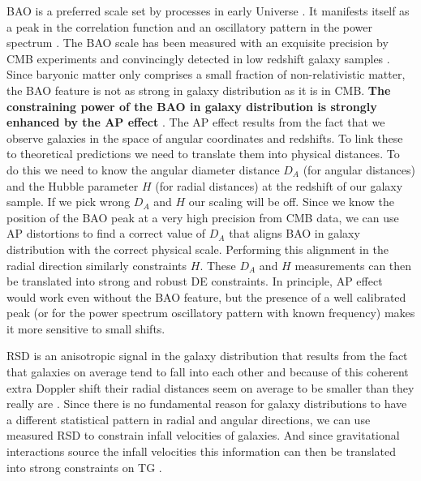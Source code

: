 BAO is a preferred scale set by processes in early Universe
\cite{1970ApJ...162..815P,1970Ap&SS...7....3S}. It manifests
itself as a peak in the correlation function and an oscillatory pattern in the
power spectrum \cite{1997Natur.386...37H,1998ApJ...496..605E}. The BAO scale has been measured with an exquisite precision by
CMB experiments and convincingly detected in low redshift galaxy samples
\cite{2005MNRAS.362..505C,2005ApJ...633..560E,2010MNRAS.401.2148P,2011MNRAS.416.3017B,2011MNRAS.418.1707B,2014JCAP...05..027F,2015A&A...574A..59D,2015MNRAS.449..835R}. Since
baryonic matter only comprises a small fraction of non-relativistic matter, the
BAO feature is not as strong in galaxy distribution as it is in CMB. \textbf{The
constraining power of the BAO in galaxy distribution is strongly enhanced by
the AP effect} \cite{1979Natur.281..358A}. The AP effect results from the fact that we observe galaxies in the space of
angular coordinates and redshifts. To link these  to theoretical  predictions
we need to translate them into physical distances. To do this we need to know
the angular diameter distance $D_A$ (for angular distances)  and the Hubble
parameter $H$ (for radial distances) at the redshift of our galaxy sample. If
we pick wrong $D_A$ and $H$ our scaling will be off. Since we know the
position of the BAO peak at a very high precision from CMB data, we can use AP
distortions to find a correct value of $D_A$ that aligns BAO in galaxy
distribution with the correct physical scale. Performing this alignment in the
radial direction similarly constraints $H$. These $D_A$ and $H$ measurements
can then be translated into strong and robust DE constraints. In principle, AP
effect would work even without the BAO feature, but the presence of a well
calibrated peak (or for the power spectrum oscillatory pattern with known
frequency) makes it more sensitive to small shifts.

RSD is an anisotropic signal in the galaxy distribution that results from the
fact that galaxies on average tend to fall into each other and because of this
coherent extra Doppler shift their radial distances seem on average to be
smaller than they really are \cite{1998ASSL..231..185H}. Since there is no
fundamental reason for galaxy distributions to have a different statistical
pattern in radial and angular directions, we can use measured RSD to constrain
infall velocities of galaxies. And since gravitational interactions source the
infall velocities this information can then be translated into strong
constraints on TG
\cite{2013MNRAS.429.1514S,2015PhRvD..91f3008X,2016MNRAS.456.3743A}.

